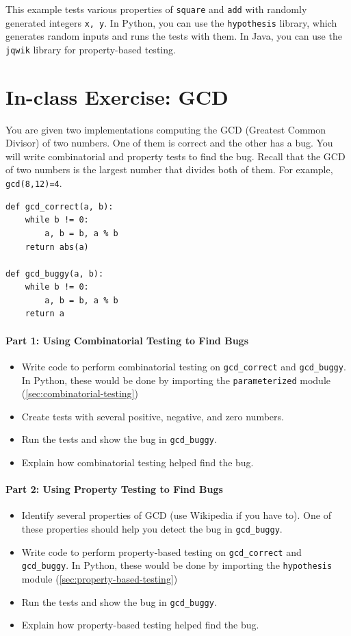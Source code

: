 \documentclass[oneside,11pt,dvipsnames]{book}
\newcommand{\code}[1]{\texttt{#1}}
\begin{document}
This example tests various properties of \code{square} and \code{add} with randomly generated integers \code{x, y}. In Python, you can use the \code{hypothesis} library, which generates random inputs and runs the tests with them. In Java, you can use the \code{jqwik} library for property-based testing.


\section{In-class Exercise: GCD}
You are given two implementations computing the GCD (Greatest Common Divisor) of two numbers. One of them is correct and the other has a bug.  You will write combinatorial and property tests to find the bug. Recall that the GCD of two numbers is the largest number that divides both of them. For example, \code{gcd(8,12)=4}. 


\begin{lstlisting}[multicols=2]
def gcd_correct(a, b):
    while b != 0:
        a, b = b, a % b
    return abs(a)

def gcd_buggy(a, b):
    while b != 0:
        a, b = b, a % b
    return a
\end{lstlisting}

\paragraph{Part 1: Using Combinatorial Testing to Find Bugs}
\begin{itemize} 
    \item Write code to perform combinatorial testing on \code{gcd\_correct} and \code{gcd\_buggy}. In Python, these would be done by importing the \code{parameterized} module (\autoref{sec:combinatorial-testing})
    \item Create tests with several positive, negative, and zero numbers.
    \item Run the tests and show the bug in \code{gcd\_buggy}.  
    \item Explain how combinatorial testing helped find the bug.
\end{itemize}

\paragraph{Part 2: Using Property Testing to Find Bugs}
\begin{itemize}
\item Identify several properties of GCD (use Wikipedia if you have to). One of these properties should help you detect the bug in \code{gcd\_buggy}.
\item Write code to perform property-based testing on \code{gcd\_correct} and \code{gcd\_buggy}. In Python, these would be done by importing the \code{hypothesis} module (\autoref{sec:property-based-testing})
\item Run the tests and show the bug in \code{gcd\_buggy}.
\item Explain how property-based testing helped find the bug.
\end{itemize}
\end{document}
